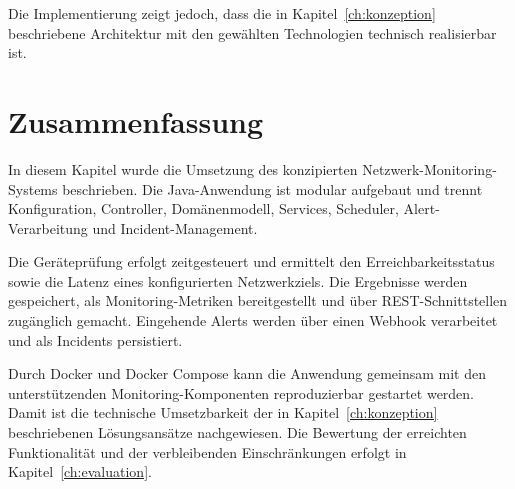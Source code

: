 Die Implementierung zeigt jedoch, dass die in Kapitel~\ref{ch:konzeption} beschriebene Architektur mit den gewählten Technologien technisch realisierbar ist.

\section{Zusammenfassung}
\label{sec:zusammenfassung-implementierung}

In diesem Kapitel wurde die Umsetzung des konzipierten Netzwerk-Monitoring-Systems beschrieben. Die Java-Anwendung ist modular aufgebaut und trennt Konfiguration, Controller, Domänenmodell, Services, Scheduler, Alert-Verarbeitung und Incident-Management.

Die Geräteprüfung erfolgt zeitgesteuert und ermittelt den Erreichbarkeitsstatus sowie die Latenz eines konfigurierten Netzwerkziels. Die Ergebnisse werden gespeichert, als Monitoring-Metriken bereitgestellt und über REST-Schnittstellen zugänglich gemacht. Eingehende Alerts werden über einen Webhook verarbeitet und als Incidents persistiert.

Durch Docker und Docker Compose kann die Anwendung gemeinsam mit den unterstützenden Monitoring-Komponenten reproduzierbar gestartet werden. Damit ist die technische Umsetzbarkeit der in Kapitel~\ref{ch:konzeption} beschriebenen Lösungsansätze nachgewiesen. Die Bewertung der erreichten Funktionalität und der verbleibenden Einschränkungen erfolgt in Kapitel~\ref{ch:evaluation}.